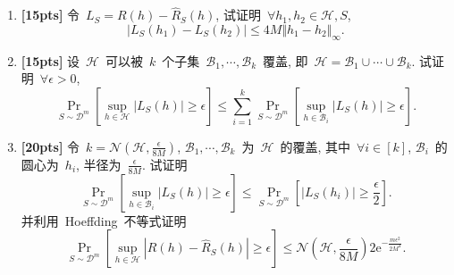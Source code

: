 \documentclass[a4paper,UTF8]{article}
\numberwithin{equation}{section}
\begin{document}
	\begin{enumerate}[(1)]
		\item \textbf{[15pts]} 令~$L_S = R(h) - \hat{R}_S(h)$, 试证明~$\forall h_1 , h_2 \in \mathcal{H} , S $, 
		\begin{equation}
			\left| L_S(h_1) - L_S(h_2) \right| \leqslant 4 M \Vert h_1 - h_2 \Vert_\infty . 
		\end{equation}
		\item \textbf{[15pts]} 设~$\mathcal{H}$~可以被~$k$~个子集~$\mathcal{B}_1 , \cdots , \mathcal{B}_k$~覆盖, 即~$\mathcal{H} = \mathcal{B}_1 \cup \cdots \cup \mathcal{B}_k $. 试证明~$\forall \epsilon > 0$, 
		\begin{equation}
			\mathop{\text{Pr}} \limits_{S \sim \mathcal{D}^m} \left[ \sup_{h \in \mathcal{H}} \left| L_S(h) \right| \geqslant \epsilon \right] 
			\leqslant \sum_{i=1}^k \mathop{\text{Pr}} \limits_{S \sim \mathcal{D}^m} \left[ \sup_{h \in \mathcal{B}_i} \left| L_S(h) \right| \geqslant \epsilon \right] . 
		\end{equation}
		\item \textbf{[20pts]} 令~$k = \mathcal{N} \left( \mathcal{H} , \frac{\epsilon}{8M} \right)$, $\mathcal{B}_1 , \cdots , \mathcal{B}_k$~为~$\mathcal{H}$~的覆盖, 其中~$\forall i \in [k]$, $\mathcal{B}_i$~的圆心为~$h_i$, 半径为~$\frac{\epsilon}{8M}$. 试证明
		\begin{equation}
			\mathop{\text{Pr}} \limits_{S \sim \mathcal{D}^m} \left[ \sup_{h \in \mathcal{B}_i} \left| L_S(h) \right| \geqslant \epsilon \right] 
			\leqslant \mathop{\text{Pr}} \limits_{S \sim \mathcal{D}^m} \left[ \left| L_S(h_i) \right| \geqslant \frac{\epsilon}{2} \right] . 
		\end{equation}
		并利用~Hoeffding~不等式证明
		\begin{equation}
			\mathop{\text{Pr}} \limits_{S \sim \mathcal{D}^m} \left[ \sup_{h \in \mathcal{H}} \left| R(h) - \hat{R}_S(h) \right| \geqslant \epsilon \right] 
			\leqslant \mathcal{N} \left( \mathcal{H} , \frac{\epsilon}{8M} \right) 2 \mathrm{e}^{ - \frac{m\epsilon^2}{2M^4} } . 
		\end{equation}
	\end{enumerate}
	
\end{document}
